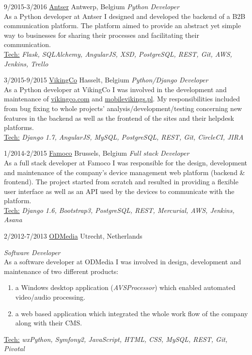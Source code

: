 \documentclass[]{friggeri-cv} %
\begin{document}
\begin{entrylist}


\entry
{9/2015-3/2016}
{\href{http://antser.be}{Antser}}
{Antwerp, Belgium}
{\emph {Python Developer} \\
As a Python developer at Antser I designed and developed the backend of a B2B communication platform. The platform aimed to provide an abstract yet simple way to businesses for sharing their processes and facilitating their communication.\\
\ul{Tech:} \emph{Flask, SQLAlchemy, AngularJS, XSD, PostgreSQL, REST, Git, AWS, Jenkins, Trello}
}

\entry
{3/2015-9/2015}
{\href{http://vikingco.com}{VikingCo}}
{Hasselt, Belgium}
{\emph {Python/Django Developer} \\
As a Python developer at VikingCo I was involved in the development and maintenance of \href{https://vikingco.com}{vikingco.com} and \href{https://mobilevikings.pl}{mobilevikings.pl}. My responsibilities included from bug fixing to whole projects' analysis/development/testing concerning new features in the backend as well as the frontend of the sites and their helpdesk platforms.\\
\ul{Tech:} \emph{Django 1.7, AngularJS, MySQL, PostgreSQL, REST, Git, CircleCI, JIRA}
}

\entry
{1/2014-2/2015}
{\href{http://famoco.com}{Famoco}}
{Brussels, Belgium}
{\emph {Full stack Developer} \\
As a full stack developer at Famoco I was responsible for the design, development and maintenance of the company's device management web platform (backend \& frontend). The project started from scratch and resulted in providing a flexible user interface as well as an API used by the devices to communicate with the platform. \\
\ul{Tech:} \emph{Django 1.6, Bootstrap3, PostgreSQL, REST, Mercurial, AWS, Jenkins, Asana}
}

\entry
{2/2012-7/2013}
{\href{http://odmedia.nl}{ODMedia}}
{Utrecht, Netherlands}
{\emph {Software Developer} \\
As a software developer at ODMedia I was involved in design, development and maintenance of two different products:
\begin{enumerate}
\item a Windows desktop application (\emph{AVSProcessor}) which enabled automated video/audio processing.
\item a web based application which integrated the whole work flow of the company along with their CMS.
\end{enumerate}
\ul{Tech:} \emph{wxPython, Symfony2, JavaScript, HTML, CSS, MySQL, REST, Git, Pivotal}
}

\end{entrylist}
\end{document}

